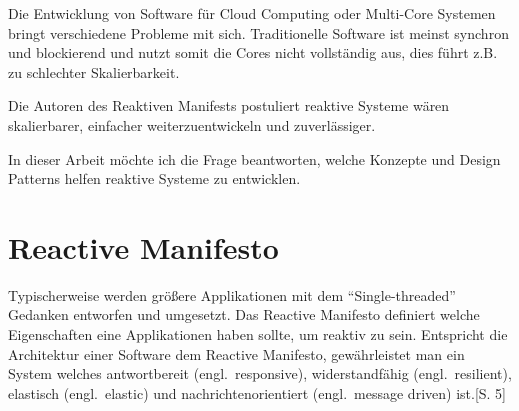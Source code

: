 Die Entwicklung von Software für Cloud Computing oder Multi-Core Systemen bringt verschiedene Probleme mit sich. Traditionelle Software ist meinst synchron und blockierend und nutzt somit die Cores nicht vollständig aus, dies führt z.B. zu schlechter Skalierbarkeit.

Die Autoren des Reaktiven Manifests postuliert reaktive Systeme wären skalierbarer, einfacher weiterzuentwickeln und zuverlässiger.\cite{boner_reactive_2014}

In dieser Arbeit möchte ich die Frage beantworten, welche Konzepte und Design Patterns helfen reaktive Systeme zu entwicklen.

\section{Reactive Manifesto}

Typischerweise werden größere Applikationen mit dem \enquote{Single-threaded} Gedanken entworfen und umgesetzt. Das Reactive Manifesto definiert welche Eigenschaften eine Applikationen haben sollte, um reaktiv zu sein. Entspricht die Architektur einer Software dem Reactive Manifesto, gewährleistet man ein System welches antwortbereit (engl.\ responsive), widerstandfähig (engl.\ resilient), elastisch (engl.\ elastic) und nachrichtenorientiert (engl.\ message driven) ist.\cite{vernon_reactive_2016}[S. 5]\cite{boner_reactive_2014}




